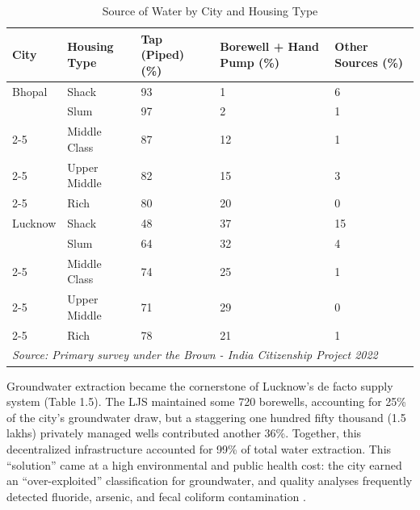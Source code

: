 \begin{table}[ht]
\centering
\renewcommand{\arraystretch}{1.3} %
\setlength{\tabcolsep}{5pt} %
\begin{tabular}{|p{3cm}|p{3cm}|p{2.5cm}|p{3cm}|p{3cm}|}
\hline
\textbf{City} & \textbf{Housing Type} & \textbf{Tap (Piped)} (\%) & \textbf{Borewell + Hand Pump} (\%) & \textbf{Other Sources} (\%) \\ \hline
Bhopal & Shack          & 93 & 1  & 6  \\ \hline
       & Slum           & 97 & 2  & 1  \\ \cline{2-5}
       & Middle Class    & 87 & 12 & 1  \\ \cline{2-5}
       & Upper Middle    & 82 & 15 & 3  \\ \cline{2-5}
       & Rich            & 80 & 20 & 0  \\ \hline
Lucknow & Shack         & 48 & 37 & 15 \\ \hline
        & Slum          & 64 & 32 & 4  \\ \cline{2-5}
        & Middle Class   & 74 & 25 & 1  \\ \cline{2-5}
        & Upper Middle   & 71 & 29 & 0  \\ \cline{2-5}
        & Rich           & 78 & 21 & 1  \\ \hline
\multicolumn{5}{l}{\textit{Source: Primary survey under the Brown - India Citizenship Project 2022}} \\ %
\end{tabular}

\caption{Source of Water by City and Housing Type}
\label{tab:water_by_housing}
\end{table}

\vspace{2mm}


Groundwater extraction became the cornerstone of Lucknow’s de facto supply system (Table 1.5). The LJS maintained some 720 borewells, accounting for 25\% of the city’s groundwater draw, but a staggering one hundred fifty thousand (1.5 lakhs) privately managed wells contributed another 36\%.\citep{foster_lucknow_2009} Together, this decentralized infrastructure accounted for 99\% of total water extraction. This “solution” came at a high environmental and public health cost: the city earned an “over-exploited” classification for groundwater, and quality analyses frequently detected fluoride, arsenic, and fecal coliform contamination \citep{sinha_state_2021}.


